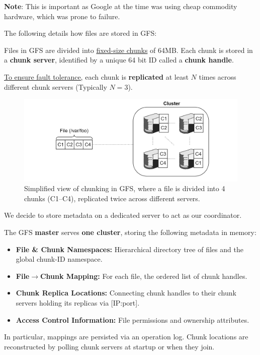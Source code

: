 \vspace{1em}
\noindent
\textbf{Note}: This is important as Google at the time was using cheap commodity hardware, which was prone to failure.

\newpage 

\noindent
The following details how files are stored in GFS:

\begin{Def}

  Files in GFS are divided into \underline{fixed-size chunks} of 64MB.
  Each chunk is stored in a \textbf{chunk server}, identified by a unique 64 bit ID called a \textbf{chunk handle}.

  \underline{To ensure fault tolerance,} each chunk is \textbf{replicated} at least $N$ times across different chunk servers (Typically $N=3$).
\end{Def}

\begin{figure}[h]
  \centering
  \includegraphics[width=\textwidth]{Sections/gfs/chunk.png}
  \caption{Simplified view of chunking in GFS, where a file is divided into 4 chunks (C1--C4), replicated twice across different servers.}
  \label{fig:gfs-chunking}
\end{figure}


\noindent
We decide to store metadata on a dedicated server to act as our coordinator.
\begin{Def}

  The GFS \textbf{master} serves \textbf{one cluster}, storing the following metadata in memory:
  \begin{itemize}
    \item \textbf{File \& Chunk Namespaces:} Hierarchical directory tree of files and the global chunk-ID namespace.
    \item \textbf{File$\to$Chunk Mapping:} For each file, the ordered list of chunk handles.
    \item \textbf{Chunk Replica Locations:} Connecting chunk handles to their chunk servers holding its replicas via [IP:port].
    \item \textbf{Access Control Information:} File permissions and ownership attributes.
  \end{itemize}
  
  \noindent
  In particular, mappings are persisted via an operation log. 
  Chunk locations are reconstructed by polling chunk servers at startup or when they join.
\end{Def}




